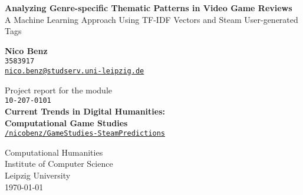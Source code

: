 \documentclass[11pt, a4paper]{article}
\begin{document}
\onehalfspacing

\begin{titlepage}
    \begin{center}
        \vspace*{1cm}
        \huge
        \textbf{Analyzing Genre-specific Thematic Patterns in Video Game Reviews}\\
        A Machine Learning Approach Using TF-IDF Vectors and Steam User-generated Tags

        \vfill
        
        \LARGE   
        \textbf{Nico Benz}\\
        \texttt{3583917}\\
        \href{mailto:nico.benz@studserv.uni-leipzig.de}{\texttt{nico.benz@studserv.uni-leipzig.de}}
        
            
         \vfill
            
        Project report for the module\\
        \texttt{10-207-0101}\\
        \textbf{Current Trends in Digital Humanities:}\\
        \textbf{Computational Game Studies}\\
        
          \vfill
         \href{https://github.com/nicobenz/GameStudies-SteamPredictions}{\texttt{\faGithub{}/nicobenz/GameStudies-SteamPredictions}}
           
        
         \vfill   
        \Large
        Computational Humanities\\
        Institute of Computer Science\\
        Leipzig University\\
        \vspace{\baselineskip}
        \today
        
            
    \end{center}
\end{titlepage}
\end{document}
